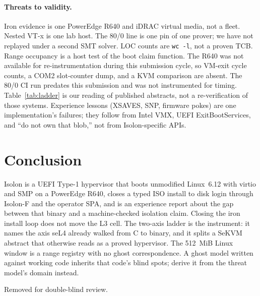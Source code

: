 \documentclass[sigplan,10pt,anonymous]{acmart}
\begin{document}
\paragraph{Threats to validity.}
\label{sec:threats}
Iron evidence is one PowerEdge R640 and iDRAC virtual media, not a
fleet. Nested VT-x is one lab host. The 80/0 line is one pin of one
prover; we have not replayed under a second SMT solver. LOC counts are
\texttt{wc -l}, not a proven TCB. Range occupancy is a host test of the boot
claim function. The R640 was not available for re-instrumentation during
this submission cycle, so VM-exit cycle counts, a COM2 slot-counter dump,
and a KVM comparison are absent. The 80/0 CI run predates this submission
and was not instrumented for timing. Table~\ref{tab:ladder} is our reading
of published abstracts, not a re-verification of those systems. Experience
lessons (XSAVES, SNP, firmware pokes) are one implementation's failures;
they follow from Intel VMX, UEFI ExitBootServices, and ``do not own that
blob,'' not from Isolon-specific APIs.

\section{Conclusion}

Isolon is a UEFI Type-1 hypervisor that boots unmodified Linux~6.12 with
virtio and SMP on a PowerEdge R640, closes a typed ISO install to disk
login through Isolon-F and the operator SPA, and is an experience report
about the gap between that binary and a machine-checked isolation claim.
Closing the iron install loop does not move the L3 cell. The two-axis
ladder is the instrument: it names the axis seL4 already walked from C to
binary, and it splits a SeKVM abstract that otherwise reads as a proved
hypervisor. The 512~MiB Linux window is a range registry with no ghost
correspondence. A ghost model written against working code inherits that
code's blind spots; derive it from the threat model's domain instead.

\begin{acks}
Removed for double-blind review.
\end{acks}



\end{document}
